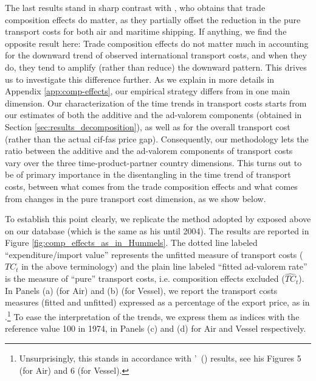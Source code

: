 \documentclass[a4paper,11pt]{article}
\newcommand\citeh[1]{\citeauthor{#1}'\ (\citeyear{#1})}
\begin{document}
The last results stand in sharp contrast with \citet{hummels2007}, who obtains that trade composition effects do matter, as they partially offset the reduction in the pure transport costs for both air and maritime shipping.
If anything, we find the opposite result here: Trade composition effects do not matter much in accounting for the downward trend of observed international transport costs, and when they do, they tend to amplify (rather than reduce) the downward pattern.
This drives us to investigate this difference further.
As we explain in more details in Appendix \ref{app:comp-effects}, our empirical strategy differs from \cite{hummels2007} in one main dimension.
Our characterization of the time trends in transport costs starts from our estimates of both the additive and the ad-valorem components (obtained in Section \ref{sec:results_decomposition}), as well as for the overall transport cost (rather than the actual cif-fas price gap).
Consequently, our methodology lets the ratio between the additive and the ad-valorem components of transport costs vary over the three time-product-partner country dimensions.
This turns out to be of primary importance in the disentangling in the time trend of transport costs, between what comes from the trade composition effects and what comes from changes in the pure transport cost dimension, as we show below.

To establish this point clearly, we replicate the method adopted by \cite{hummels2007} exposed above on our database (which is the same as his until 2004).
The results are reported in Figure \ref{fig:comp_effects_as_in_Hummels}.
The dotted line labeled ``expenditure/import value'' represents the unfitted measure of transport costs ($TC_t$ in the above terminology) and the plain line labeled ``fitted ad-valorem rate'' is the measure of ``pure'' transport costs, i.e.
composition effects excluded ($\widehat{TC}_t$).
In Panels (a) (for Air) and (b) (for Vessel), we report the transport costs measures (fitted and unfitted) expressed as a percentage of the export price, as in \cite{hummels2007}.\footnote{Unsurprisingly, this stands in accordance with \citeh{hummels2007} results, see his Figures 5 (for Air) and 6 (for Vessel).} To ease the interpretation of the trends, we express them as indices with the reference value 100 in 1974, in Panels (c) and (d) for Air and Vessel respectively.
\end{document}
